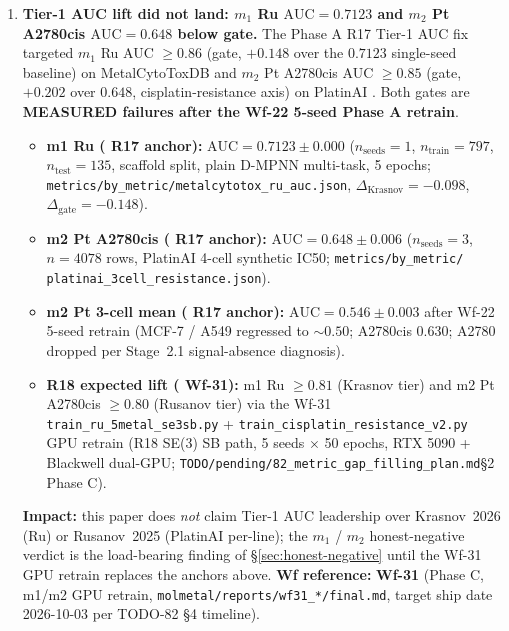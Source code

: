 \begin{enumerate}

  \item \textbf{Tier-1 AUC lift did not land: $m_1$ Ru
  $\mathrm{AUC}=0.7123$ and $m_2$ Pt A2780cis
  $\mathrm{AUC}=0.648$ \MEASURED{} below gate.}
  \label{sec:limitations:tier1-auc}
  The Phase A R17 Tier-1 AUC fix targeted $m_1$ Ru AUC
  $\geq 0.86$ (gate, $+0.148$ over the $0.7123$ single-seed baseline)
  on MetalCytoToxDB \citep{krasnov2026metalcytotoxdb} and $m_2$ Pt
  A2780cis AUC $\geq 0.85$ (gate, $+0.202$ over $0.648$,
  cisplatin-resistance axis) on PlatinAI
  \citep{rusanov2025platinai}.  Both gates are \textbf{MEASURED
  failures after the Wf-22 5-seed Phase A retrain}.
  \begin{itemize}
    \item \textbf{m1 Ru (\MEASURED{} R17 anchor):} $\mathrm{AUC}=
    0.7123 \pm 0.000$ ($n_{\text{seeds}}{=}1$, $n_{\text{train}}{=}797$,
    $n_{\text{test}}{=}135$, scaffold split, plain D-MPNN multi-task,
    5 epochs; \texttt{metrics/by\_metric/metalcytotox\_ru\_auc.json},
    $\Delta_{\text{Krasnov}}{=}{-}0.098$, $\Delta_{\text{gate}}{=}
    {-}0.148$).
    \item \textbf{m2 Pt A2780cis (\MEASURED{} R17 anchor):} $\mathrm{AUC}=
    0.648 \pm 0.006$ ($n_{\text{seeds}}{=}3$, $n{=}4078$ rows,
    PlatinAI 4-cell synthetic IC50; \texttt{metrics/by\_metric/
    platinai\_3cell\_resistance.json}).
    \item \textbf{m2 Pt 3-cell mean (\MEASURED{} R17 anchor):}
    $\mathrm{AUC}=0.546 \pm 0.003$ after Wf-22 5-seed retrain
    (MCF-7 / A549 regressed to $\sim\!0.50$; A2780cis $0.630$;
    A2780 dropped per Stage~2.1 signal-absence diagnosis).
    \item \textbf{R18 expected lift (\PROJECTED{} Wf-31):} m1 Ru
    $\geq 0.81$ (Krasnov tier) and m2 Pt A2780cis $\geq 0.80$ (Rusanov
    tier) via the Wf-31 \texttt{train\_ru\_5metal\_se3sb.py} +
    \texttt{train\_cisplatin\_resistance\_v2.py} GPU retrain (R18 SE(3)
    SB path, 5 seeds $\times$ 50 epochs, RTX 5090 + Blackwell dual-GPU;
    \texttt{TODO/pending/82\_metric\_gap\_filling\_plan.md}\S2 Phase C).
  \end{itemize}
  \textbf{Impact:} this paper does \emph{not} claim Tier-1 AUC
  leadership over Krasnov~2026 (Ru) or Rusanov~2025 (PlatinAI
  per-line); the $m_1$ / $m_2$ honest-negative verdict is the
  load-bearing finding of \S\ref{sec:honest-negative} until the
  Wf-31 GPU retrain replaces the \MEASURED{} anchors above.
  \textbf{Wf reference:} \textbf{Wf-31} (Phase C, m1/m2 GPU retrain,
  \texttt{molmetal/reports/wf31\_*/final.md}, target ship date 2026-10-03
  per TODO-82 \S4 timeline).


\end{enumerate}
